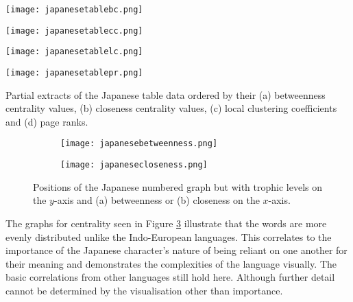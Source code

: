 \begin{table}[!htb]
\centering
\begin{subtable}{.2\textwidth}
	\centering
	\texttt{[image: japanesetablebc.png]}
	\caption{}
	\label{table:japanesetablebc}
\end{subtable}
\hfill
\begin{subtable}{.2\textwidth}
	\centering
	\texttt{[image: japanesetablecc.png]}
	\caption{}
	\label{table:japanesetablecc}
\end{subtable}
\hfill
\begin{subtable}{.2\textwidth}
	\centering
	\texttt{[image: japanesetablelc.png]}
	\caption{}
	\label{table:japanesetablelc}
\end{subtable}
\hfill
\begin{subtable}{.2\textwidth}
	\centering
	\texttt{[image: japanesetablepr.png]}
	\caption{}
	\label{table:japanesetablepr}
\end{subtable}
\caption{Partial extracts of the Japanese table data ordered by their (a) betweenness centrality values, (b) closeness centrality values, (c) local clustering coefficients and (d) page ranks.}
\label{table:japanesedatar}
\end{table}

\begin{figure}[!htb]
\centering
\begin{subfigure}{.45\textwidth}
	\hspace{-1cm} 
	\texttt{[image: japanesebetweenness.png]}
	\caption{}
	\label{fig:jpbc}
\end{subfigure}
\hfill
\begin{subfigure}{.45\textwidth}
	\hspace{-1cm} 
	\texttt{[image: japanesecloseness.png]}
	\caption{ }
	\label{fig:jpcc}
\end{subfigure}
\caption{Positions of the Japanese numbered graph but with trophic levels on the $y$-axis and (a) betweenness or (b) closeness on the $x$-axis.}
\label{fig:jpcentrality}
\end{figure}

The graphs for centrality seen in Figure \ref{fig:jpcentrality} illustrate that the words are more evenly distributed unlike the Indo-European languages. This correlates to the importance of the Japanese character's nature of being reliant on one another for their meaning and demonstrates the complexities of the language visually. The basic correlations from other languages still hold here. Although further detail cannot be determined by the visualisation other than importance. 

